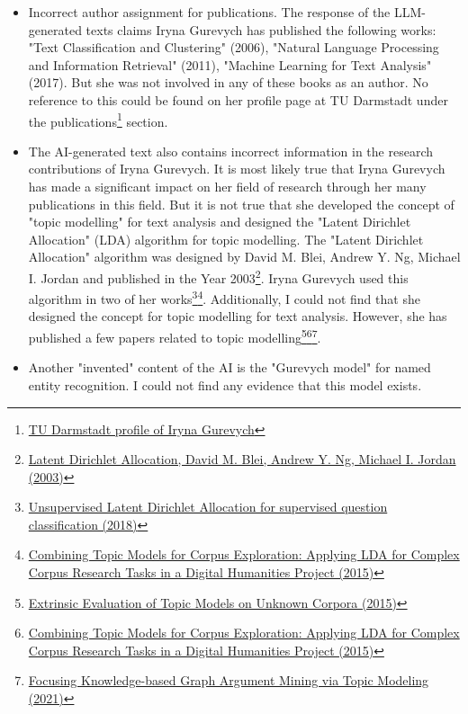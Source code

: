 \documentclass[a4 paper]{article}
\numberwithin{equation}{section}
\newcommand{\0}{\mathbf{0}}
\begin{document}
\begin{itemize}
	\item Incorrect author assignment for publications. The response of the LLM-generated texts claims Iryna Gurevych has published the following works: "Text Classification and Clustering" (2006), "Natural Language Processing and Information Retrieval" (2011), "Machine Learning for Text Analysis" (2017). But she was not involved in any of these books as an author. No reference to this could be found on her profile page at TU Darmstadt under the publications\footnote{\href{https://www.informatik.tu-darmstadt.de/ukp/ukp_home/head_ukp/index.en.jsp}{TU Darmstadt profile of Iryna Gurevych}} section.
	
	\item The AI-generated text also contains incorrect information in the research contributions of Iryna Gurevych. It is most likely true that Iryna Gurevych has made a significant impact on her field of research through her many publications in this field. But it is not true that she developed the concept of "topic modelling" for text analysis and designed the "Latent Dirichlet Allocation" (LDA) algorithm for topic modelling. The "Latent Dirichlet Allocation" algorithm was designed by David M. Blei, Andrew Y. Ng, Michael I. Jordan and published in the Year 2003\footnote{\href{https://jmlr.csail.mit.edu/papers/v3/blei03a.html}{Latent Dirichlet Allocation, David M. Blei, Andrew Y. Ng, Michael I. Jordan (2003)}}. Iryna Gurevych used this algorithm in two of her works\footnote{\href{https://tubiblio.ulb.tu-darmstadt.de/110325/}{Unsupervised Latent Dirichlet Allocation for supervised question classification (2018)}}\footnote{\href{https://tubiblio.ulb.tu-darmstadt.de/104619/}{Combining Topic Models for Corpus Exploration: Applying LDA for Complex Corpus Research Tasks in a Digital Humanities Project (2015)}}. Additionally, I could not find that she designed the concept for topic modelling for text analysis. However, she has published a few papers related to topic modelling\footnote{\href{https://tubiblio.ulb.tu-darmstadt.de/104618/}{Extrinsic Evaluation of Topic Models on Unknown Corpora (2015)}}\footnote{\href{https://tubiblio.ulb.tu-darmstadt.de/104619/}{Combining Topic Models for Corpus Exploration: Applying LDA for Complex Corpus Research Tasks in a Digital Humanities Project (2015)}}\footnote{\href{https://tubiblio.ulb.tu-darmstadt.de/144475/}{Focusing Knowledge-based Graph Argument Mining via Topic Modeling (2021)}}.
	
	\item Another "invented" content of the AI is the "Gurevych model" for named entity recognition. I could not find any evidence that this model exists.
\end{itemize}
\end{document}
